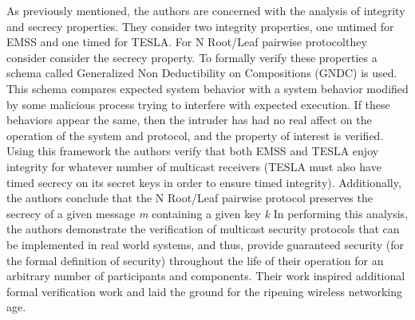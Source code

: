 \documentclass[12pt, fullpage]{article}
\begin{document}
As previously mentioned, the authors are concerned with the analysis of integrity and secrecy properties. They consider two integrity properties, one untimed for EMSS and one timed for \textmugreek TESLA. For N Root/Leaf pairwise protocolthey consider consider the secrecy property. To formally verify these properties a schema called Generalized Non Deductibility on Compositions (GNDC) is used. This schema compares expected system behavior with a system behavior modified by some malicious process trying to interfere with expected execution. If these behaviors appear the same, then the intruder has had no real affect on the operation of the system and protocol, and the property of interest is verified. Using this framework the authors verify that both EMSS and \textmugreek TESLA enjoy integrity for whatever number of multicast receivers (\textmugreek TESLA must also have timed secrecy on its secret keys in order to ensure timed integrity). Additionally, the authors conclude that the N Root/Leaf pairwise protocol preserves the secrecy of a given message \textit{m} containing a given key \textit{k}
\bigbreak
In performing this analysis, the authors demonstrate the verification of multicast security protocols that can be implemented in real world systems, and thus, provide guaranteed security (for the formal definition of security) throughout the life of their operation for an arbitrary number of participants and components. Their work inspired additional formal verification work and laid the ground for the ripening wireless networking age. 
\bigbreak
\end{document}
